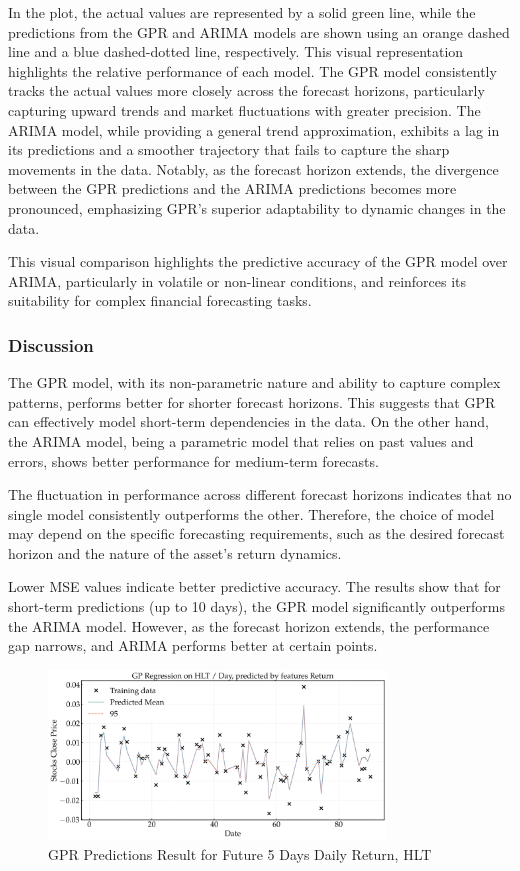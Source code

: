 \noindent In the plot, the actual values are represented by a solid green line, while the predictions from the GPR and ARIMA models are shown using an orange dashed line and a blue dashed-dotted line, respectively. This visual representation highlights the relative performance of each model.
The \ac{GPR} model consistently tracks the actual values more closely across the forecast horizons, particularly capturing upward trends and market fluctuations with greater precision. The ARIMA model, while providing a general trend approximation, exhibits a lag in its predictions and a smoother trajectory that fails to capture the sharp movements in the data. Notably, as the forecast horizon extends, the divergence between the GPR predictions and the ARIMA predictions becomes more pronounced, emphasizing GPR’s superior adaptability to dynamic changes in the data.

This visual comparison highlights the predictive accuracy of the GPR model over ARIMA, particularly in volatile or non-linear conditions, and reinforces its suitability for complex financial forecasting tasks.
\subsubsection{Discussion}

The GPR model, with its non-parametric nature and ability to capture complex patterns, performs better for shorter forecast horizons. This suggests that GPR can effectively model short-term dependencies in the data. On the other hand, the ARIMA model, being a parametric model that relies on past values and errors, shows better performance for medium-term forecasts.

The fluctuation in performance across different forecast horizons indicates that no single model consistently outperforms the other. Therefore, the choice of model may depend on the specific forecasting requirements, such as the desired forecast horizon and the nature of the asset's return dynamics.

Lower MSE values indicate better predictive accuracy. The results show that for short-term predictions (up to 10 days), the GPR model significantly outperforms the ARIMA model. However, as the forecast horizon extends, the performance gap narrows, and ARIMA performs better at certain points.

\begin{figure}[htbp]
\centering
\includegraphics[width=0.8\textwidth]{figures/future_predictions_HLT_return.png}
\caption{GPR Predictions Result for Future 5 Days Daily Return, HLT}
\label{fig:future_predictions_HLT_return}
\end{figure}


